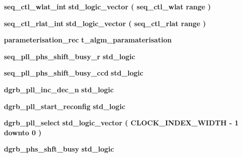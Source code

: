 \begin{DoxyCompactItemize}
\item 
{\bf seq\+\_\+ctl\+\_\+wlat\+\_\+int} {\bfseries \textcolor{comment}{std\+\_\+logic\+\_\+vector}\textcolor{vhdlchar}{ }\textcolor{vhdlchar}{(}\textcolor{vhdlchar}{ }{\bfseries {\bf seq\+\_\+ctl\+\_\+wlat}} \textcolor{vhdlchar}{ }\textcolor{vhdlchar}{\textquotesingle{}}\textcolor{vhdlchar}{ }\textcolor{keywordflow}{range}\textcolor{vhdlchar}{ }\textcolor{vhdlchar}{ }\textcolor{vhdlchar}{)}\textcolor{vhdlchar}{ }} 
\item 
{\bf seq\+\_\+ctl\+\_\+rlat\+\_\+int} {\bfseries \textcolor{comment}{std\+\_\+logic\+\_\+vector}\textcolor{vhdlchar}{ }\textcolor{vhdlchar}{(}\textcolor{vhdlchar}{ }{\bfseries {\bf seq\+\_\+ctl\+\_\+rlat}} \textcolor{vhdlchar}{ }\textcolor{vhdlchar}{\textquotesingle{}}\textcolor{vhdlchar}{ }\textcolor{keywordflow}{range}\textcolor{vhdlchar}{ }\textcolor{vhdlchar}{ }\textcolor{vhdlchar}{)}\textcolor{vhdlchar}{ }} 
\item 
{\bf parameterisation\+\_\+rec} {\bfseries \textcolor{vhdlchar}{t\+\_\+algm\+\_\+paramaterisation}\textcolor{vhdlchar}{ }} 
\item 
{\bf seq\+\_\+pll\+\_\+phs\+\_\+shift\+\_\+busy\+\_\+r} {\bfseries \textcolor{comment}{std\+\_\+logic}\textcolor{vhdlchar}{ }} 
\item 
{\bf seq\+\_\+pll\+\_\+phs\+\_\+shift\+\_\+busy\+\_\+ccd} {\bfseries \textcolor{comment}{std\+\_\+logic}\textcolor{vhdlchar}{ }} 
\item 
{\bf dgrb\+\_\+pll\+\_\+inc\+\_\+dec\+\_\+n} {\bfseries \textcolor{comment}{std\+\_\+logic}\textcolor{vhdlchar}{ }} 
\item 
{\bf dgrb\+\_\+pll\+\_\+start\+\_\+reconfig} {\bfseries \textcolor{comment}{std\+\_\+logic}\textcolor{vhdlchar}{ }} 
\item 
{\bf dgrb\+\_\+pll\+\_\+select} {\bfseries \textcolor{comment}{std\+\_\+logic\+\_\+vector}\textcolor{vhdlchar}{ }\textcolor{vhdlchar}{(}\textcolor{vhdlchar}{ }\textcolor{vhdlchar}{ }\textcolor{vhdlchar}{ }\textcolor{vhdlchar}{ }{\bfseries {\bf C\+L\+O\+C\+K\+\_\+\+I\+N\+D\+E\+X\+\_\+\+W\+I\+D\+TH}} \textcolor{vhdlchar}{-\/}\textcolor{vhdlchar}{ } \textcolor{vhdldigit}{1} \textcolor{vhdlchar}{ }\textcolor{keywordflow}{downto}\textcolor{vhdlchar}{ }\textcolor{vhdlchar}{ } \textcolor{vhdldigit}{0} \textcolor{vhdlchar}{ }\textcolor{vhdlchar}{)}\textcolor{vhdlchar}{ }} 
\item 
{\bf dgrb\+\_\+phs\+\_\+shft\+\_\+busy} {\bfseries \textcolor{comment}{std\+\_\+logic}\textcolor{vhdlchar}{ }} 
\item 

\end{DoxyCompactItemize}
